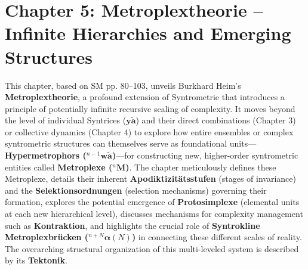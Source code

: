 \documentclass[12pt]{article}
\newcommand{\syntrix}{\bm{y\widetilde{a}}}
\newcommand{\metroplex}[1]{{}^{#1}\mathbf{M}}
\newcommand{\hypermetrophor}[1]{{}^{#1}\mathbf{w\widetilde{a}}}
\newcommand{\syntroklinebruecke}[1]{{}^{#1}\bm{\alpha}}
\begin{document}
\clearpage
\section{Chapter 5: Metroplextheorie – Infinite Hierarchies and Emerging Structures}
\label{sec:chapter5}

This chapter, based on SM pp. 80–103, unveils Burkhard Heim's \textbf{Metroplextheorie}, a profound extension of Syntrometrie that introduces a principle of potentially infinite recursive scaling of complexity. It moves beyond the level of individual Syntrices (\(\syntrix\)) and their direct combinations (Chapter 3) or collective dynamics (Chapter 4) to explore how entire ensembles or complex syntrometric structures can themselves serve as foundational units—\textbf{Hypermetrophors (\(\hypermetrophor{n-1}\))}—for constructing new, higher-order syntrometric entities called \textbf{Metroplexe (\(\metroplex{n}\))}. The chapter meticulously defines these Metroplexe, details their inherent \textbf{Apodiktizitätsstufen} (stages of invariance) and the \textbf{Selektionsordnungen} (selection mechanisms) governing their formation, explores the potential emergence of \textbf{Protosimplexe} (elemental units at each new hierarchical level), discusses mechanisms for complexity management such as \textbf{Kontraktion}, and highlights the crucial role of \textbf{Syntrokline Metroplexbrücken (\(\syntroklinebruecke{n+N}(N)\))} in connecting these different scales of reality. The overarching structural organization of this multi-leveled system is described by its \textbf{Tektonik}.
\end{document}
